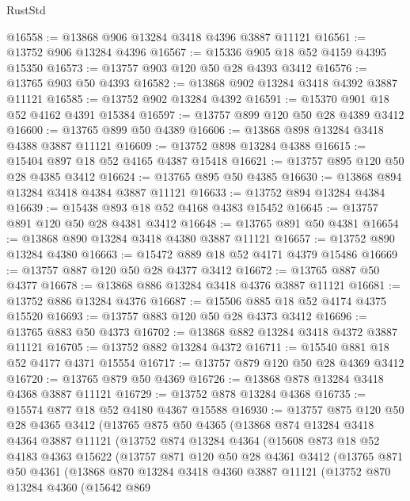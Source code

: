 \begin{lexlean}{RustStd}
\begin{coremodule}
@16558 := @13868 @906 @13284 @3418 @4396 @3887 @11121
@16561 := @13752 @906 @13284 @4396
@16567 := @15336 @905 @18 @52 @4159 @4395 @15350
@16573 := @13757 @903 @120 @50 @28 @4393 @3412
@16576 := @13765 @903 @50 @4393
@16582 := @13868 @902 @13284 @3418 @4392 @3887 @11121
@16585 := @13752 @902 @13284 @4392
@16591 := @15370 @901 @18 @52 @4162 @4391 @15384
@16597 := @13757 @899 @120 @50 @28 @4389 @3412
@16600 := @13765 @899 @50 @4389
@16606 := @13868 @898 @13284 @3418 @4388 @3887 @11121
@16609 := @13752 @898 @13284 @4388
@16615 := @15404 @897 @18 @52 @4165 @4387 @15418
@16621 := @13757 @895 @120 @50 @28 @4385 @3412
@16624 := @13765 @895 @50 @4385
@16630 := @13868 @894 @13284 @3418 @4384 @3887 @11121
@16633 := @13752 @894 @13284 @4384
@16639 := @15438 @893 @18 @52 @4168 @4383 @15452
@16645 := @13757 @891 @120 @50 @28 @4381 @3412
@16648 := @13765 @891 @50 @4381
@16654 := @13868 @890 @13284 @3418 @4380 @3887 @11121
@16657 := @13752 @890 @13284 @4380
@16663 := @15472 @889 @18 @52 @4171 @4379 @15486
@16669 := @13757 @887 @120 @50 @28 @4377 @3412
@16672 := @13765 @887 @50 @4377
@16678 := @13868 @886 @13284 @3418 @4376 @3887 @11121
@16681 := @13752 @886 @13284 @4376
@16687 := @15506 @885 @18 @52 @4174 @4375 @15520
@16693 := @13757 @883 @120 @50 @28 @4373 @3412
@16696 := @13765 @883 @50 @4373
@16702 := @13868 @882 @13284 @3418 @4372 @3887 @11121
@16705 := @13752 @882 @13284 @4372
@16711 := @15540 @881 @18 @52 @4177 @4371 @15554
@16717 := @13757 @879 @120 @50 @28 @4369 @3412
@16720 := @13765 @879 @50 @4369
@16726 := @13868 @878 @13284 @3418 @4368 @3887 @11121
@16729 := @13752 @878 @13284 @4368
@16735 := @15574 @877 @18 @52 @4180 @4367 @15588
@16930 := @13757
    @875
    @120
    @50
    @28
    @4365
    @3412
    (@13765
      @875
      @50
      @4365
      (@13868
        @874
        @13284
        @3418
        @4364
        @3887
        @11121
        (@13752
          @874
          @13284
          @4364
          (@15608
            @873
            @18
            @52
            @4183
            @4363
            @15622
            (@13757
              @871
              @120
              @50
              @28
              @4361
              @3412
              (@13765
                @871
                @50
                @4361
                (@13868
                  @870
                  @13284
                  @3418
                  @4360
                  @3887
                  @11121
                  (@13752
                    @870
                    @13284
                    @4360
                    (@15642
                      @869

\end{coremodule}
\end{lexlean}
